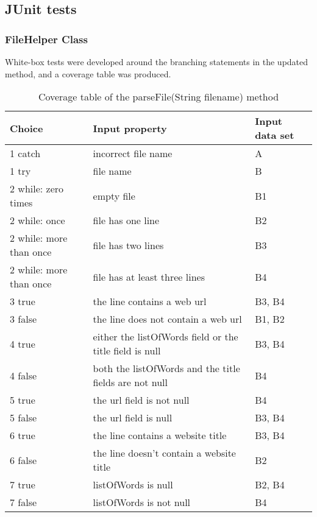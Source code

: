 \subsection{JUnit tests}

\subsubsection{FileHelper Class}

White-box tests were developed around the branching statements in the updated method, and a coverage table was produced.

\begin{table}[!h]
    \caption{Coverage table of the parseFile(String filename) method}
    \begin{tabular}{|l|p{100pt}|l|}
        \hline
        \textbf{Choice} & \textbf{Input property} & \textbf{Input data set} \\ \hline
        1 catch & incorrect file name & A \\ \hline
        1 try & file name & B \\ \hline
        2 while: zero times & empty file & B1 \\ \hline
        2 while: once & file has one line & B2 \\ \hline
        2 while: more than once & file has two lines & B3 \\ \hline
        2 while: more than once & file has at least three lines & B4 \\ \hline
        3 true & the line contains a web url & B3, B4 \\ \hline
        3 false & the line does not contain a web url & B1, B2 \\ \hline
        4 true & either the listOfWords field or the title field is null & B3, B4 \\ \hline
        4 false & both the listOfWords and the title fields are not null & B4 \\ \hline
        5 true & the url field is not null & B4 \\ \hline
        5 false & the url field is null & B3, B4 \\ \hline
        6 true & the line contains a website title & B3, B4 \\ \hline
        6 false & the line doesn't contain a website title & B2 \\ \hline
        7 true & listOfWords is null & B2, B4 \\ \hline
        7 false & listOfWords is not null & B4 \\ \hline
    \end{tabular}
\end{table}

